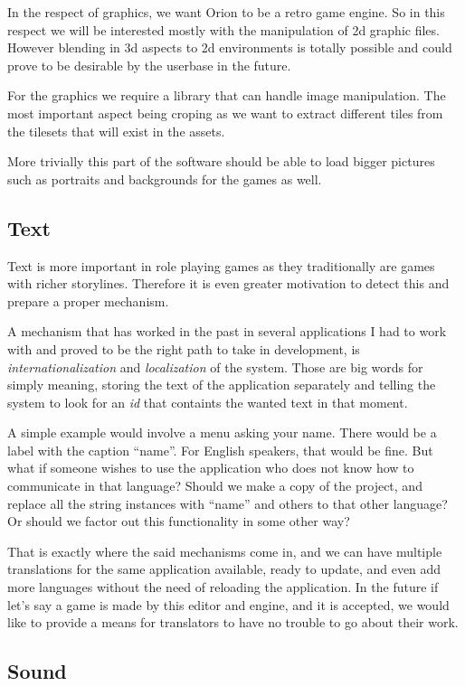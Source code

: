 In the respect of graphics, we want Orion to be a retro game engine. So in this
respect we will be interested mostly with the manipulation of 2d graphic files.
However blending in 3d aspects to 2d environments is totally possible and could
prove to be desirable by the userbase in the future.

For the graphics we require a library that can handle image manipulation. The
most important aspect being croping as we want to extract different tiles from
the tilesets that will exist in the assets.

More trivially this part of the software should be able to load bigger pictures
such as portraits and backgrounds for the games as well.

\subsection{Text}

Text is more important in role playing games as they traditionally are games
with richer storylines. Therefore it is even greater motivation to detect this
and prepare a proper mechanism.

A mechanism that has worked in the past in several applications I had to work
with and proved to be the right path to take in development, is
\textit{internationalization} and \textit{localization} of the system. Those
are big words for simply meaning, storing the text of the application separately
and telling the system to look for an \textit{id} that containts the wanted
text in that moment.

A simple example would involve a menu asking your name. There would be a label
with the caption ``name''. For English speakers, that would be fine. But what
if someone wishes to use the application who does not know how to communicate
in that language? Should we make a copy of the project, and replace all the
string instances with ``name'' and others to that other language? Or should we
factor out this functionality in some other way?

That is exactly where the said mechanisms come in, and we can have multiple
translations for the same application available, ready to update, and even add
more languages without the need of reloading the application. In the future if
let's say a game is made by this editor and engine, and it is accepted, we
would like to provide a means for translators to have no trouble to go about
their work.

\subsection{Sound}

